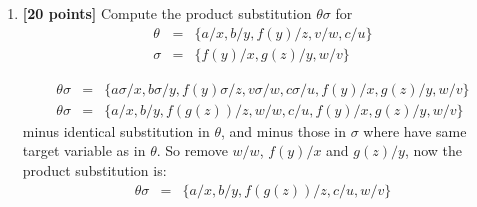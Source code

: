 \documentclass{article}
\begin{document}
\begin{enumerate}
\begin{answer}
  \end{answer}
\item \textbf{[20 points]} Compute the product substitution $\theta\sigma$
  for
  \begin{eqnarray*}
    \theta &=& \{ a/x, b/y, f(y)/z, v/w, c/u \} \\
    \sigma &=& \{ f(y)/x, g(z)/y, w/v \} 
  \end{eqnarray*}
  \begin{answer}
    \begin{eqnarray*}
      \theta \sigma &=& \{ a\sigma/x, b\sigma/y, f(y)\sigma/z, v\sigma/w, c\sigma/u,  f(y)/x, g(z)/y, w/v\} \\
      \theta \sigma &=& \{ a/x, b/y, f(g(z))/z, w/w, c/u,  f(y)/x, g(z)/y, w/v\} 
    \end{eqnarray*}
    minus identical substitution in $\theta$, and minus those in $\sigma$ where have same target variable as in $\theta$.
    So remove $w/w$, $f(y)/x$ and $g(z)/y$, now the product substitution is:
    \begin{eqnarray*}
      \theta \sigma &=& \{ a/x, b/y, f(g(z))/z, c/u, w/v\} 
    \end{eqnarray*}
  \end{answer}
\end{enumerate}
\end{document}
